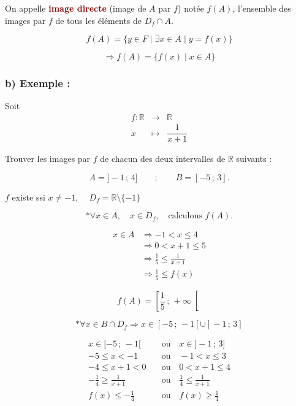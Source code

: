 \documentclass[12pt,a4paper]{article}
\begin{document}
On appelle \textcolor{darkred}{\textbf{image directe}} (image de $A$ par $f$)
notée $f(A)$, l'ensemble des images par $f$ de tous les éléments de $D_f \cap A$.

\[
\boxed{
f(A)=\{y\in F\mid \exists x\in A\mid y=f(x)\}
}
\]

\[
\Longrightarrow
f(A)=\{f(x)\mid x\in A\}
\]

\subsubsection*{\textbf{b) Exemple :}}

Soit
\[
\begin{array}{rcl}
f:\mathbb{R} & \longrightarrow & \mathbb{R}\\
x & \longmapsto & \dfrac{1}{x+1}
\end{array}
\]

Trouver les images par $f$ de chacun des deux intervalles de $\mathbb{R}$ suivants :

\[
A=]-1\,;\,4]
\qquad;\qquad
B=[-5\,;\,3].
\]

$f$ existe ssi $x\neq -1$, $\quad D_f=\mathbb{R}\setminus\{-1\}$

\[
\ast \forall x\in A,\quad x\in D_f,\quad \text{calculons } f(A).
\]

\[
\begin{aligned}
x\in A
&\Longrightarrow -1<x\leq4\\
&\Longrightarrow 0<x+1\leq5\\
&\Longrightarrow \frac{1}{5}\leq\frac{1}{x+1}\\
&\Longrightarrow \frac{1}{5}\leq f(x)
\end{aligned}
\]

\[
\boxed{
f(A)=\left[\frac{1}{5}\,;\,+\infty\right[
}
\]

\bigskip

\[
\ast \forall x\in B\cap D_f
\Longrightarrow
x\in[-5\,;\,-1[\cup]-1\,;\,3]
\]

\[
\begin{aligned}
x\in[-5\,;\,-1[
&\quad\text{ou}\quad x\in]-1\,;\,3]\\
-5\leq x<-1
&\quad\text{ou}\quad -1<x\leq3\\
-4\leq x+1<0
&\quad\text{ou}\quad 0<x+1\leq4\\
-\frac{1}{4}\geq\frac{1}{x+1}
&\quad\text{ou}\quad \frac{1}{4}\leq\frac{1}{x+1}\\
f(x)\leq-\frac{1}{4}
&\quad\text{ou}\quad f(x)\geq\frac{1}{4}
\end{aligned}
\]
\end{document}
